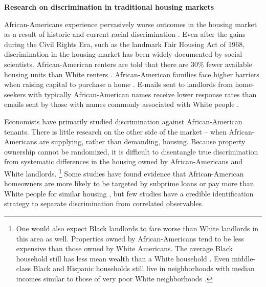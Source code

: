 
\newpage

\textbf{Research on discrimination in traditional housing markets}

African-Americans experience pervasively worse outcomes in the housing market as a result of historic and current racial discrimination \citep{krysan}. Even after the gains during the Civil Rights Era, such as the landmark Fair Housing Act of 1968, discrimination in the housing market has been widely documented by social scientists. African-American renters are told that there are 30\% fewer available housing units than White renters \citep{yinger1}. African-American families face higher barriers when raising capital to purchase a home \citep{pope}. E-mails sent to landlords from home-seekers with typically African-American names receive lower response rates than emails sent by those with names commonly associated with White people \citep{hanson}.

Economists have primarily studied discrimination against African-American tenants. There is little research on the other side of the market -- when African-Americans are supplying, rather than demanding, housing. Because property ownership cannot be randomized, it is difficult to disentangle true discrimination from systematic differences in the housing owned by African-Americans and White landlords.%
	\footnote{One would also expect Black landlords to fare worse than White landlords in this area as well. Properties owned by African-Americans tend to be less expensive than those owned by White Americans. The average Black household still has less mean wealth than a White household \citep{oliver}. Even middle-class Black and Hispanic households still live in neighborhoods with median incomes similar to those of very poor White neighborhoods \citep{reardon}.} 
Some studies have found evidence that African-American homeowners are more likely to be targeted by subprime loans \citep{foreclosure} or pay more than White people for similar housing \citep{bayer, myers}, but few studies have a credible identification strategy to separate discrimination from correlated observables. 

